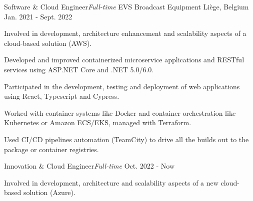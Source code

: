 
\begin{cventries}

  \cventry
    {Software \& Cloud Engineer{\enskip\cdotp\enskip}\it{Full-time}} %
    {EVS Broadcast Equipment} %
    {Liège, Belgium} %
    {Jan. 2021 - Sept. 2022} %
    {
      \begin{cvitems} %
        \item{Involved in development, architecture enhancement and scalability aspects of a cloud-based solution (AWS).}
        \item{Developed and improved containerized microservice applications and RESTful services using ASP.NET Core and .NET 5.0/6.0.}
        \item{Participated in the development, testing and deployment of web applications using React, Typescript and Cypress.}
        \item{Worked with container systems like Docker and container orchestration like Kubernetes or Amazon ECS/EKS, managed with Terraform.}
        \item{Used CI/CD pipelines automation (TeamCity) to drive all the builds out to the package or container registries.}
      \end{cvitems}
    }

  \cventry
    {Innovation \& Cloud Engineer{\enskip\cdotp\enskip}\it{Full-time}} %
    {} %
    {} %
    {Oct. 2022 - Now} %
    {
      \begin{cvitems} %
        \item{Involved in development, architecture and scalability aspects of a new cloud-based solution (Azure).}
      \end{cvitems}
    }


\end{cventries}
